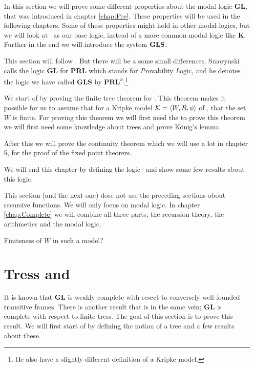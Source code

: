 \documentclass[../main.tex]{subfiles}
\begin{document}
In this section we will prove some different properties about the modal logic
\textbf{GL}, that was introduced in chapter \ref{chap:Pre}.
These properties will be used in the following chapters. Some of these properties might
hold in other modal logics, but we will look at \GL\ as our base logic,
instead of a more common modal logic like \textbf{K}.
Further in the end we will introduce the system $\text{\textbf{GLS}}$.

This section will follow \parencite{Smor1985}. But there will be a some small
differences. Smorynski calls the logic \textbf{GL} for \textbf{PRL} which
stands for \textit{Pr}ovability \textit{L}ogic, and he denotes the logic we
have called \textbf{GLS} by $\textbf{PRL}^\omega$.\footnote{He also have a
slightly different definition of a Kripke model.}

We start of by proving the finite tree theorem for \GL. This theorem makes it
possible for us to assume that for a Kripke model $\mathcal{K}=\langle W,R,\phi\rangle$ of
\GL, that the set $W$ is finite. For proving this theorem we will first need
the to prove this theorem we will first need some knowledge about trees and
prove König's lemma.

After this we will prove the continuity theorem which we will use a lot in
chapter 5, for the proof of the fixed point theorem.

We will end this chapter by defining the logic \GLS\ and show some few results
about this logic.

This section (and the next one) dose not use the preceding sections about recursive functions. We will only
focus on modal logic. In
chapter \ref{chap:Complete} we will combine all three parts; the recursion
theory, the arithmetics and the modal logic.


Finiteness of $W$ in such a model?
\section{Tress and \GL}

It is known that \textbf{GL} is weakly complete with resect to conversely
well-founded transitive frames. There is another result that is in the same
vein; \textbf{GL} is complete with respect to finite tress. The goal of this
section is to prove this result. We will first start of by defining the notion
of a tree and a few results about these.
\end{document}
